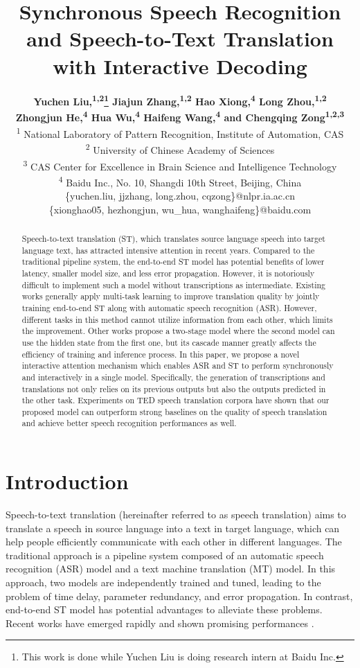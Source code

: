\documentclass[letterpaper]{article} %
\title{Synchronous Speech Recognition and Speech-to-Text Translation \\ with Interactive Decoding}
\author{
	\Large \textbf{
		Yuchen Liu,\textsuperscript{\rm 1,2}\thanks{This work is done while Yuchen Liu is doing research intern at Baidu Inc.}
		Jiajun Zhang,\textsuperscript{\rm 1,2}
		Hao Xiong,\textsuperscript{\rm 4}
		Long Zhou,\textsuperscript{\rm 1,2}} \\
	\Large \textbf{
		Zhongjun He,\textsuperscript{\rm 4}
		Hua Wu,\textsuperscript{\rm 4}
		Haifeng Wang,\textsuperscript{\rm 4}
		and Chengqing Zong\textsuperscript{\rm 1,2,3}}\\
	\textsuperscript{\rm 1} National Laboratory of Pattern Recognition, Institute of Automation, CAS\\
	\textsuperscript{\rm 2} University of Chinese Academy of Sciences\\
	\textsuperscript{\rm 3} CAS Center for Excellence in Brain Science and Intelligence Technology\\
	\textsuperscript{\rm 4} Baidu Inc., No. 10, Shangdi 10th Street, Beijing, China\\
	\{yuchen.liu, jjzhang, long.zhou, cqzong\}@nlpr.ia.ac.cn\\
	\{xionghao05, hezhongjun, wu\_hua, wanghaifeng\}@baidu.com
}
\begin{document}
\maketitle

\begin{abstract}
Speech-to-text translation (ST), which translates source language speech into target language text, has attracted intensive attention in recent years.
Compared to the traditional pipeline system, the end-to-end ST model has potential benefits of lower latency, smaller model size, and less error propagation.
However, it is notoriously difficult to implement such a model without transcriptions as intermediate.
Existing works generally apply multi-task learning to improve translation quality by jointly training end-to-end ST along with automatic speech recognition (ASR). However, different tasks in this method cannot utilize information from each other, which limits the improvement. Other works propose a two-stage model where the second model can use the hidden state from the first one, but its cascade manner greatly affects the efficiency of training and inference process.
In this paper, we propose a novel interactive attention mechanism which enables ASR and ST to perform synchronously and interactively in a single model.
Specifically, the generation of transcriptions and translations not only relies on its previous outputs but also the outputs predicted in the other task. Experiments on TED speech translation corpora have shown that our proposed model can outperform strong baselines on the quality of speech translation and achieve better speech recognition performances as well.
\end{abstract}

\section{Introduction}
\label{introduction}
Speech-to-text translation (hereinafter referred to as speech translation)
aims to translate a speech in source language into a text in target language, which can help people efficiently communicate with each other in different languages.
The traditional approach is a pipeline system composed of an automatic speech recognition (ASR) model and a text machine translation (MT) model.
In this approach, two models are independently trained and tuned, leading to the problem of time delay, parameter redundancy, and error propagation.
In contrast, end-to-end ST model has potential advantages to alleviate these problems. Recent works have  emerged rapidly and shown promising performances
\cite{weiss2017sequence,berard2018end,bansal2018pre,jia2019leveraging,sperber2019attention}.
\end{document}
